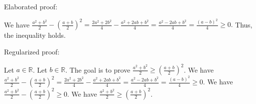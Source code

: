 \documentclass{article}
\begin{document}
Elaborated proof:
\begin{tcolorbox}[colback=green!10, width=\linewidth]
We have
$ \frac{a^2+b^2}{2} - \left(\frac{a+b}{2}\right)^2 = \frac{2a^2+2b^2}{4} - \frac{a^2+2ab+b^2}{4} = \frac{a^2-2ab+b^2}{4} = \frac{(a-b)^2}{4} \ge 0. $
Thus, the inequality holds.
\end{tcolorbox}

Regularized proof:
\begin{tcolorbox}[colback=red!10, width=\linewidth]
Let $a\in\mathbb{R}$.
Let $b\in\mathbb{R}$.
The goal is to prove $\frac{a^2+b^2}{2} \ge {\left(\frac{a+b}{2}\right)}^2$.
We have $\frac{a^2+b^2}{2} - {\left(\frac{a+b}{2}\right)}^2 = \frac{2a^2+2b^2}{4} - \frac{a^2+2ab+b^2}{4} = \frac{a^2-2ab+b^2}{4} = \frac{{{(a-b)}}^2}{4} \ge 0$.
We have $\frac{a^2+b^2}{2} - {\left(\frac{a+b}{2}\right)}^2 \ge 0$.
We have $\frac{a^2+b^2}{2} \ge {\left(\frac{a+b}{2}\right)}^2$.
\end{tcolorbox}
\end{document}
